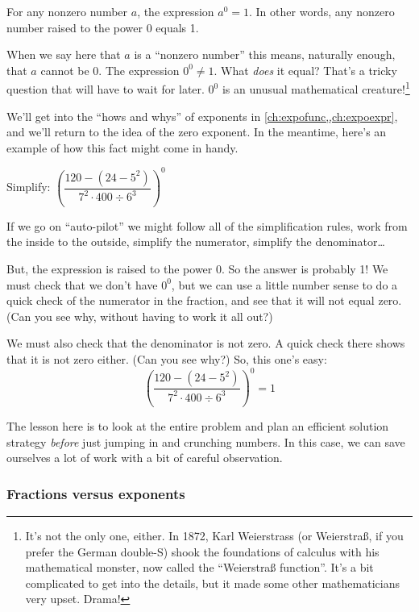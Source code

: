 \begin{boxdef}
For any nonzero number $a$, the expression $a^0 = 1$. In other words, any nonzero number raised to the power 0 equals 1.
\end{boxdef}

When we say here that $a$ is a ``nonzero number'' this means, naturally enough, that $a$ cannot be 0. The expression $0^0 \neq 1$. What \textit{does} it equal? That's a tricky question that will have to wait for later. $0^0 $ is an unusual mathematical creature!\footnote{It's not the only one, either. In 1872, Karl Weierstrass (or Weierstra\ss, if you prefer the German double-S) shook the foundations of calculus with his mathematical monster, now called the ``Weierstra\ss{} function''. It's a bit complicated to get into the details, but it made some other mathematicians very upset. Drama!}

We'll get into the ``hows and whys'' of exponents in \cref{ch:expofunc,,ch:expoexpr}, and we'll return to the idea of the zero exponent. In the meantime, here's an example of how this fact might come in handy.

\begin{boxex}
Simplify: $\left( \dfrac{120-(24-5^2)}{7^2 \cdot 400 \div 6^3} \right)^0$

\exsoln If we go on ``auto-pilot'' we might follow all of the simplification rules, work from the inside to the outside, simplify the numerator, simplify the denominator\ldots

But, the expression is raised to the power 0. So the answer is probably 1! We must check that we don't have $0^0$, but we can use a little number sense to do a quick check of the numerator in the fraction, and see that it will not equal zero. (Can you see why, without having to work it all out?)

We must also check that the denominator is not zero. A quick check there shows that it is not zero either. (Can you see why?) So, this one's easy:
\[\left( \frac{120-(24-5^2)}{7^2 \cdot 400 \div 6^3} \right)^0 = 1\]
\end{boxex}

The lesson here is to look at the entire problem and plan an efficient solution strategy \textit{before} just jumping in and crunching numbers. In this case, we can save ourselves a lot of work with a bit of careful observation.

\subsubsection{Fractions versus exponents}

